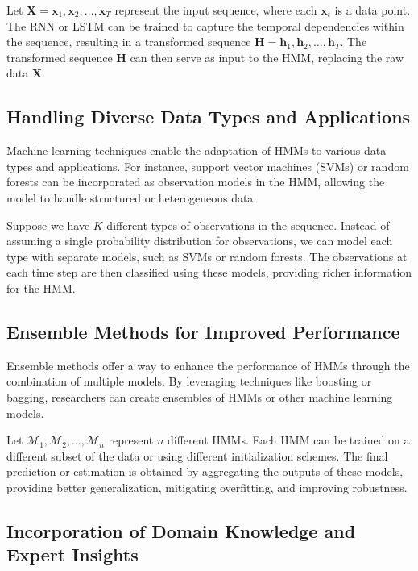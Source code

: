 \documentclass[a4paper,11pt]{article}
\begin{document}
Let $\mathbf{X} = {\mathbf{x}_1, \mathbf{x}_2, \ldots, \mathbf{x}_T}$ represent the input sequence, where each $\mathbf{x}_t$ is a data point. The RNN or LSTM can be trained to capture the temporal dependencies within the sequence, resulting in a transformed sequence $\mathbf{H} = {\mathbf{h}_1, \mathbf{h}_2, \ldots, \mathbf{h}_T}$. The transformed sequence $\mathbf{H}$ can then serve as input to the HMM, replacing the raw data $\mathbf{X}$.

\subsection*{Handling Diverse Data Types and Applications}

Machine learning techniques enable the adaptation of HMMs to various data types and applications. For instance, support vector machines (SVMs) or random forests can be incorporated as observation models in the HMM, allowing the model to handle structured or heterogeneous data.

Suppose we have $K$ different types of observations in the sequence. Instead of assuming a single probability distribution for observations, we can model each type with separate models, such as SVMs or random forests. The observations at each time step are then classified using these models, providing richer information for the HMM.

\subsection*{Ensemble Methods for Improved Performance}

Ensemble methods offer a way to enhance the performance of HMMs through the combination of multiple models. By leveraging techniques like boosting or bagging, researchers can create ensembles of HMMs or other machine learning models.

Let $\mathcal{M}_1, \mathcal{M}_2, \ldots, \mathcal{M}_n$ represent $n$ different HMMs. Each HMM can be trained on a different subset of the data or using different initialization schemes. The final prediction or estimation is obtained by aggregating the outputs of these models, providing better generalization, mitigating overfitting, and improving robustness.

\subsection*{Incorporation of Domain Knowledge and Expert Insights}
\end{document}

